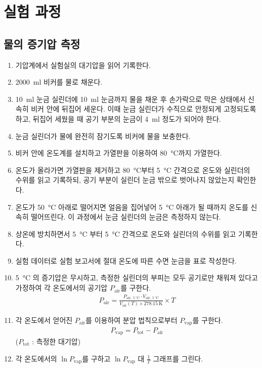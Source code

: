 \documentclass{GSHS-chemexp}
\begin{document}
	\section{실험 과정}
	
	\subsection{물의 증기압 측정}
	\begin{enumerate}
		\item 기압계에서 실험실의 대기압을 읽어 기록한다.
		\item \SI{2000}{\milli\litre} 비커를 물로 채운다.
		\item \SI{10}{\milli\litre} 눈금 실린더에 \SI{10}{\milli\litre} 눈금까지 물을 채운 후 손가락으로 막은 상태에서 신속히 비커 안에 뒤집어 세운다. 이때 눈금 실린더가 수직으로 안정되게 고정되도록 하고, 뒤집어 세웠을 때 공기 부분의 눈금이 \SI{4}{\milli\litre} 정도가 되어야 한다.
		\item 눈금 실린더가 물에 완전히 잠기도록 비커에 물을 보충한다.
		\item 비커 안에 온도계를 설치하고 가열판을 이용하여 \SI{80}{\degreeCelsius}까지 가열한다.
		\item 온도가 올라가면 가열판을 제거하고 \SI{80}{\degreeCelsius}부터 \SI{5}{\degreeCelsius} 간격으로 온도와 실린더의 수위를 읽고 기록하되, 공기 부분이 실린더 눈금 밖으로 벗어나지 않았는지 확인한다.
		\item 온도가 \SI{50}{\degreeCelsius} 아래로 떨어지면 얼음을 집어넣어 \SI{5}{\degreeCelsius} 아래가 될 때까지 온도를 신속히 떨어뜨린다. 이 과정에서 눈금 실린더의 눈금은 측정하지 않는다.
		\item 상온에 방치하면서 \SI{5}{\degreeCelsius} 부터 \SI{5}{\degreeCelsius} 간격으로 온도와 실린더의 수위를 읽고 기록한다.
		\item 실험 데이터로 실험 보고서에 절대 온도에 따른 수면 눈금을 표로 작성한다.
		\item \SI{5}{\degreeCelsius} 의 증기압은 무시하고, 측정한 실린더의 부피는 모두 공기로만 채워져 있다고 가정하여 각 온도에서의 공기압 $P_{\mathrm{air}}$를 구한다.
		\begin{gather*}
			P_{\mathrm{air}} = \frac{P_{\mathrm{air,~\SI{5}{\degreeCelsius}}} \cdot V_{\mathrm{air,~\SI{5}{\degreeCelsius}}}}{V_{\mathrm{air}}(T) \times \SI{278.15}{\kelvin}} \times T
		\end{gather*}
		\item 각 온도에서 얻어진 $P_{\mathrm{air}}$를 이용하여 분압 법칙으로부터 $P_{\mathrm{vap}}$를 구한다.
		\begin{gather*}
			P_{\mathrm{vap}} = P_{\mathrm{tot}} - P_{\mathrm{air}}
		\end{gather*}
		($P_{\mathrm{tot}}$ : 측정한 대기압)
		\item 각 온도에서의 $\ln P_{\mathrm{vap}}$를 구하고 $\ln P_{\mathrm{vap}}$ 대 $\frac{1}{T}$ 그래프를 그린다.
	\end{enumerate}
\end{document}
